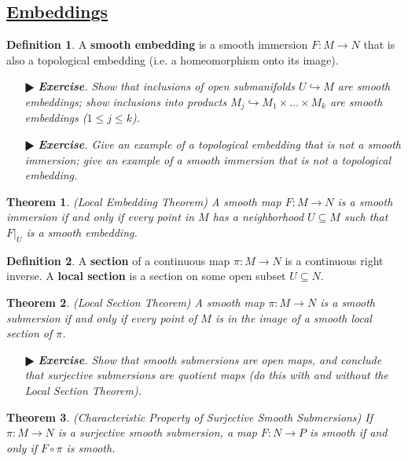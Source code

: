 \documentclass[11pt]{amsart}
\newtheorem*{theorem*}{Theorem}
\theoremstyle{definition}
\newtheorem*{definition*}{Definition}
\renewcommand\leq{\leqslant}
\renewcommand\:{\colon}
\newcommand{\1}{\mathds{1}}
\newcommand{\exc}[1]{\vspace{-2.5pt}\begin{itemize}[leftmargin=15pt]\item[$\RHD$] \textit{\textbf{Exercise}. #1}\end{itemize}}
\begin{document}
\vskip20pt



\subsection*{\underline{Embeddings}}

\begin{definition*}
	A \textbf{smooth embedding} is a smooth immersion $F\: M \to N$ that is also a topological embedding (i.e. a homeomorphism onto its image).
\end{definition*}

\exc{Show that inclusions of open submanifolds $U \hookrightarrow M$ are smooth embeddings; show inclusions into products $M_j \hookrightarrow M_1 \times \dots \times M_k$ are smooth embeddings ($1 \leq j \leq k$).}
\exc{Give an example of a topological embedding that is not a smooth immersion; give an example of a smooth immersion that is not a topological embedding.}

\begin{theorem*}
	\textnormal{(Local Embedding Theorem)} A smooth map $F\: M \to N$ is a smooth immersion if and only if every point in $M$ has a neighborhood $U \subseteq M$ such that $F|_U$ is a smooth embedding.
\end{theorem*}

\begin{definition*}
	A \textbf{section} of a continuous map $\pi\: M \to N$ is a continuous right inverse. A \textbf{local section} is a section on some open subset $U \subseteq N$. 
\end{definition*}

\begin{theorem*}
	\textnormal{(Local Section Theorem)} A smooth map $\pi\: M \to N$ is a smooth submersion if and only if every point of $M$ is in the image of a smooth local section of $\pi$.
\end{theorem*}

\exc{Show that smooth submersions are open maps, and conclude that surjective submersions are quotient maps (do this with and without the Local Section Theorem).}

\begin{theorem*}
	\textnormal{(Characteristic Property of Surjective Smooth Submersions)} If $\pi\: M \to N$ is a surjective smooth submersion, a map $F\: N \to P$ is smooth if and only if $F \circ \pi$ is smooth.
\end{theorem*}
\end{document}
